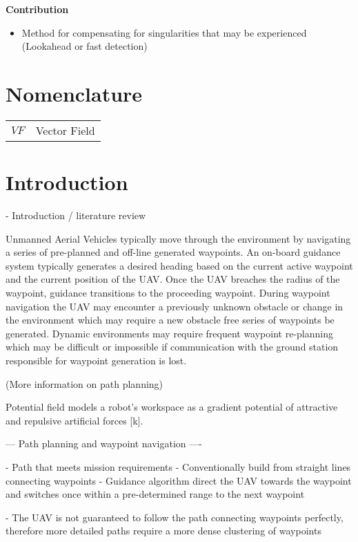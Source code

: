 \documentclass[conf]{new-aiaa}
\begin{document}
\textbf{Contribution}
\begin{itemize}
	\item Method for compensating for singularities that may be experienced (Lookahead or fast detection)
\end{itemize}




\section{Nomenclature}

{\renewcommand\arraystretch{1.0}
\noindent\begin{longtable*}{@{}l @{\quad=\quad} l@{}}
$VF$  & Vector Field \\
\end{longtable*}}

\section{Introduction}

 - Introduction / literature review

Unmanned Aerial Vehicles typically move through the environment by navigating a series of pre-planned and off-line generated waypoints. An on-board guidance system typically generates a desired heading based on the current active waypoint and the current position of the UAV. Once the UAV breaches the radius of the waypoint, guidance transitions to the proceeding waypoint. During waypoint navigation the UAV may encounter a previously unknown obstacle or change in the environment which may require a new obstacle free series of waypoints be generated. Dynamic environments may require frequent waypoint re-planning which may be difficult or impossible if communication with the ground station responsible for waypoint generation is lost. 

(More information on path planning)


Potential field models a robot's workspace as a gradient potential of attractive and repulsive artificial forces [k]. 

--- Path planning and waypoint navigation ----

- Path that meets mission requirements
- Conventionally build from straight lines connecting waypoints
- Guidance algorithm direct the UAV towards the waypoint and switches once within a pre-determined range to the next waypoint

- The UAV is not guaranteed to follow the path connecting waypoints perfectly, therefore more detailed paths require a more dense clustering of waypoints
\end{document}
